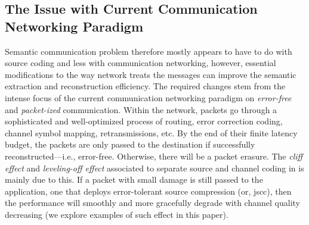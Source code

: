 \subsection{The Issue with Current Communication Networking Paradigm}

Semantic communication problem therefore mostly appears to have to do with  source coding and less with  communication networking, however, essential modifications to the way network treats the  messages can improve the  semantic extraction and reconstruction efficiency. The required changes stem from the intense focus of the current communication networking paradigm on  \emph{error-free} and \emph{packet-ized} communication. %
Within the network,  packets go through a sophisticated and well-optimized process of routing, error correction coding, channel symbol mapping, retransmissions, etc. By the end of their finite latency budget, the packets are only passed to the destination if successfully reconstructed---i.e., error-free. Otherwise, there will be a packet erasure. The \emph{cliff effect} and \emph{leveling-off effect} associated to separate source and channel coding  in \cite{gunduz2024joint} is mainly due to this. If a packet with small damage is still passed to the application, one that deploys error-tolerant source compression (or, \gls{jscc}), then the performance will smoothly and more gracefully degrade with channel quality decreasing (we  explore examples of such effect in this paper).




